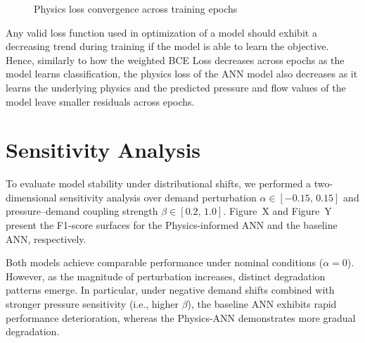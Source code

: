 \documentclass[final,5p,times,twocolumn,authoryear]{elsarticle}
\begin{document}
\begin{figure}[H]
\centering
{}
\caption{Physics loss convergence across training epochs}
\label{fig:physics_loss}
\end{figure}

Any valid loss function used in optimization of a model should exhibit a decreasing trend during training if the model is able to learn the objective. Hence, similarly to how the weighted BCE Loss decreases across epochs as the model learns classification, the physics loss of the ANN model also decreases as it  learns the underlying physics and the predicted pressure and flow values of the model leave smaller residuals across epochs.

\section{Sensitivity Analysis}

To evaluate model stability under distributional shifts, we performed a two-dimensional sensitivity analysis over demand perturbation $\alpha \in [-0.15,\, 0.15]$ and pressure--demand coupling strength $\beta \in [0.2,\, 1.0]$. Figure~X and Figure~Y present the F1-score surfaces for the Physics-informed ANN and the baseline ANN, respectively.

Both models achieve comparable performance under nominal conditions ($\alpha = 0$). However, as the magnitude of perturbation increases, distinct degradation patterns emerge. In particular, under negative demand shifts combined with stronger pressure sensitivity (i.e., higher $\beta$), the baseline ANN exhibits rapid performance deterioration, whereas the Physics-ANN demonstrates more gradual degradation.
\end{document}
